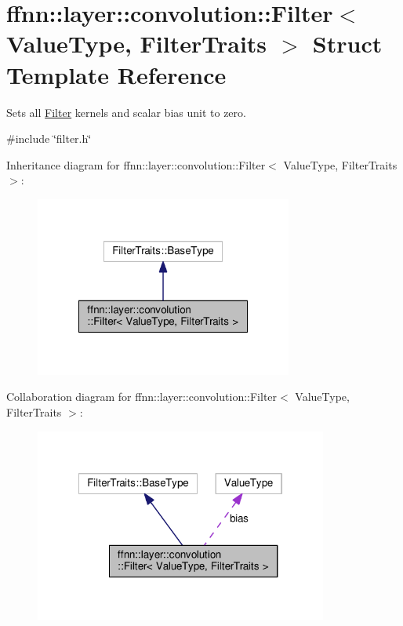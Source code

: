 \hypertarget{structffnn_1_1layer_1_1convolution_1_1_filter}{\section{ffnn\-:\-:layer\-:\-:convolution\-:\-:Filter$<$ Value\-Type, Filter\-Traits $>$ Struct Template Reference}
\label{structffnn_1_1layer_1_1convolution_1_1_filter}
}


Sets all \hyperlink{structffnn_1_1layer_1_1convolution_1_1_filter}{Filter} kernels and scalar bias unit to zero.  




{\ttfamily \#include \char`\"{}filter.\-h\char`\"{}}



Inheritance diagram for ffnn\-:\-:layer\-:\-:convolution\-:\-:Filter$<$ Value\-Type, Filter\-Traits $>$\-:\nopagebreak
\begin{figure}[H]
\begin{center}
\leavevmode
\includegraphics[width=240pt]{structffnn_1_1layer_1_1convolution_1_1_filter__inherit__graph}
\end{center}
\end{figure}


Collaboration diagram for ffnn\-:\-:layer\-:\-:convolution\-:\-:Filter$<$ Value\-Type, Filter\-Traits $>$\-:\nopagebreak
\begin{figure}[H]
\begin{center}
\leavevmode
\includegraphics[width=273pt]{structffnn_1_1layer_1_1convolution_1_1_filter__coll__graph}
\end{center}
\end{figure}
